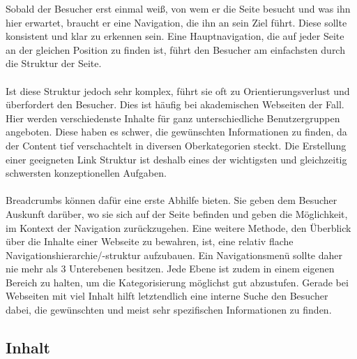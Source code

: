 Sobald der Besucher erst einmal weiß, von wem er die Seite besucht und was ihn hier erwartet, braucht er eine Navigation, die ihn an sein Ziel führt. Diese sollte konsistent und klar zu erkennen sein. Eine Hauptnavigation, die auf jeder Seite an der gleichen Position zu finden ist, führt den Besucher am einfachsten durch die Struktur der Seite.\\
\\
Ist diese Struktur jedoch sehr komplex, führt sie oft zu Orientierungsverlust und überfordert den Besucher. Dies ist häufig bei akademischen Webseiten der Fall. Hier werden verschiedenste Inhalte für ganz unterschiedliche Benutzergruppen angeboten. Diese haben es schwer, die gewünschten Informationen zu finden, da der Content tief verschachtelt in diversen Oberkategorien steckt. Die Erstellung einer geeigneten Link Struktur ist deshalb eines der wichtigsten und gleichzeitig schwersten konzeptionellen Aufgaben.\\
\\
\Gls{Breadcrumb}s können dafür eine erste Abhilfe bieten. Sie geben dem Besucher Auskunft darüber, wo sie sich auf der Seite befinden und geben die Möglichkeit, im Kontext der Navigation zurückzugehen. Eine weitere Methode, den Überblick über die Inhalte einer Webseite zu bewahren, ist, eine relativ flache Navigationshierarchie/-struktur aufzubauen. Ein Navigationsmenü sollte daher nie mehr als 3 Unterebenen besitzen. Jede Ebene ist zudem in einem eigenen Bereich zu halten, um die Kategorisierung möglichst gut abzustufen. Gerade bei Webseiten mit viel Inhalt hilft letztendlich eine interne Suche den Besucher dabei, die gewünschten und meist sehr spezifischen Informationen zu finden.

\subsection{Inhalt}

